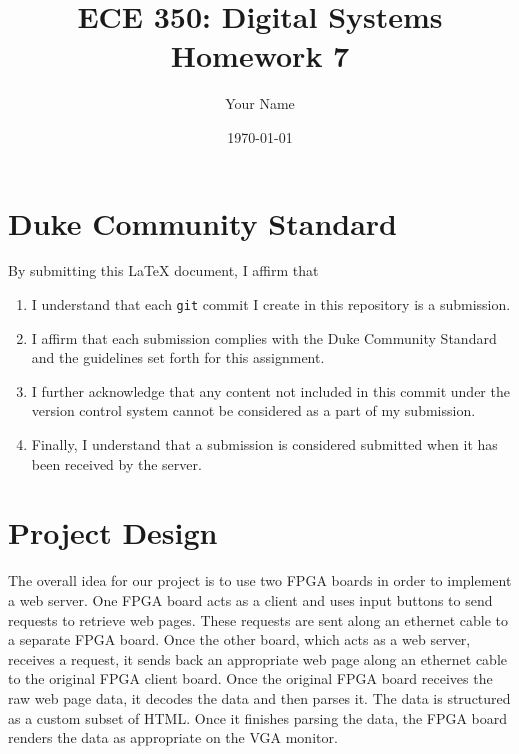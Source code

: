 \documentclass[letterpaper]{article} %
\begin{document}
\title{ECE 350: Digital Systems Homework 7}
\author{Your Name} %
\date{\today} %
\maketitle

\section*{Duke Community Standard}

By submitting this \LaTeX{} document, I affirm that
\begin{enumerate}
    \item I understand that each \texttt{git} commit I create in this repository is a submission.
    \item I affirm that each submission complies with the Duke Community Standard and the guidelines set forth for this assignment.
    \item I further acknowledge that any content not included in this commit under the version control system cannot be considered as a part of my submission.
    \item Finally, I understand that a submission is considered submitted when it has been received by the server.
\end{enumerate}

\newpage

\section{Project Design}


The overall idea for our project is to use two FPGA boards in order to implement a web server. One FPGA board acts as a client and uses input buttons to send requests to retrieve web pages. These requests are sent along an ethernet cable to a separate FPGA board. Once the other board, which acts as a web server, receives a request, it sends back an appropriate web page along an ethernet cable to the original FPGA client board. Once the original FPGA board receives the raw web page data, it decodes the data and then parses it. The data is structured as a custom subset of HTML. Once it finishes parsing the data, the FPGA board renders the data as appropriate on the VGA monitor.
\end{document}
